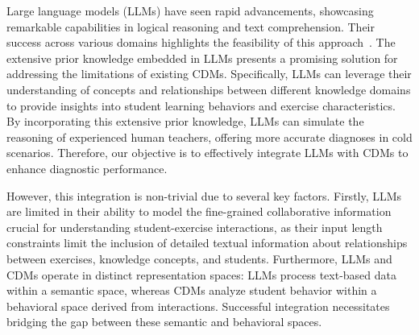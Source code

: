 Large language models (LLMs) have seen rapid advancements, showcasing remarkable capabilities in logical reasoning and text comprehension. Their success across various domains highlights the feasibility of this approach~\cite{wang2024user,xu2024eduagent,abbasiantaeb2024let,zhu2024reliable,zhang2024agentcf}. 
The extensive prior knowledge embedded in LLMs presents a promising solution for addressing the limitations of existing CDMs. Specifically, LLMs can leverage their understanding of concepts and relationships between different knowledge domains to provide insights into student learning behaviors and exercise characteristics. By incorporating this extensive prior knowledge, LLMs can simulate the reasoning of experienced human teachers, offering more accurate diagnoses in cold scenarios. Therefore, our objective is to effectively integrate LLMs with CDMs to enhance diagnostic performance. 

However, this integration is non-trivial due to several key factors.
Firstly, LLMs are limited in their ability to model the fine-grained collaborative information crucial for understanding student-exercise interactions, as their input length constraints limit the inclusion of detailed textual information about relationships between exercises, knowledge concepts, and students.
Furthermore, LLMs and CDMs operate in distinct representation spaces: LLMs process text-based data within a semantic space, whereas CDMs analyze student behavior within a behavioral space derived from interactions. 
Successful integration necessitates bridging the gap between these semantic and behavioral spaces.

